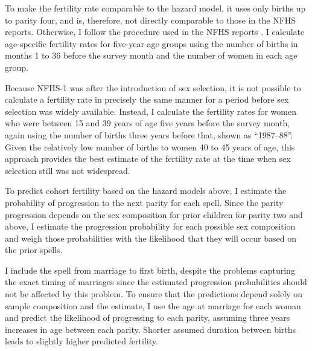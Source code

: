 \documentclass[12pt,letterpaper]{article}
\begin{document}


To make the fertility rate comparable to the hazard model, it uses only births up to 
parity four, and is, therefore, not directly comparable to those in the NFHS reports.
Otherwise, I follow the procedure used in the NFHS reports \citep{Croft2018}.
I calculate age-specific fertility rates for five-year age groups using the number of 
births in months 1 to 36 before the survey month and the number of women in each age 
group.

%

Because NFHS-1 was after the introduction of sex selection, it is not possible 
to calculate a fertility rate in precisely the same manner for a period 
before sex selection was widely available.
Instead, I calculate the fertility rates for women who were between 15 and 39 years of
age five years before the survey month, again using the number of births three years 
before that, shown as ``1987--88''.
Given the relatively low number of births to women 40 to 45 years of age, this approach 
provides the best estimate of the fertility rate at the time when sex selection still was 
not widespread.

To predict cohort fertility based on the hazard models above, I estimate the probability 
of progression to the next parity for each spell.
Since the parity progression depends on the sex composition for prior children for parity 
two and above, I estimate the progression probability for each possible sex composition
and weigh those probabilities with the likelihood that they will occur based on the
prior spells.

I include the spell from marriage to first birth, despite the problems
capturing the exact timing of marriages since the estimated progression
probabilities should not be affected by this problem.
To ensure that the predictions depend solely on sample composition and the estimate, I
use the age at marriage for each woman and predict the likelihood of progressing to
each parity, assuming three years increases in age between each parity.
Shorter assumed duration between births leads to slightly higher predicted 
fertility.
\end{document}
